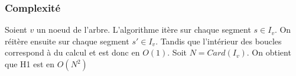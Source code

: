 \subsubsection*{Complexité}
Soient $v$ un noeud de l'arbre. L'algorithme itère sur chaque segment
$s \in I_v$.
On réitère ensuite sur chaque segment $s' \in I_v$.
Tandis que l'intérieur des boucles correspond à du calcul et
est donc en $O(1)$. Soit $N = Card(I_v)$. On obtient que H1 est en $O(N^2)$


